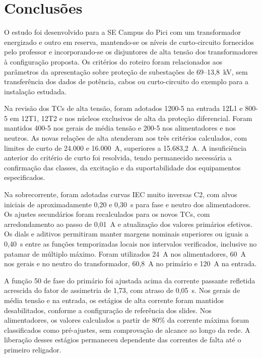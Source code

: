 \newpage
\section{\textbf{Conclusões}}

O estudo foi desenvolvido para a SE Campus do Pici com um transformador energizado e outro em reserva, mantendo-se os níveis de curto-circuito fornecidos pelo professor e incorporando-se os disjuntores de alta tensão dos transformadores à configuração proposta. Os critérios do roteiro foram relacionados aos parâmetros da apresentação sobre proteção de subestações de 69--13,8~kV, sem transferência dos dados de potência, cabos ou curto-circuito do exemplo para a instalação estudada.

Na revisão dos TCs de alta tensão, foram adotados 1200-5 na entrada 12L1 e 800-5 em 12T1, 12T2 e nos núcleos exclusivos de alta da proteção diferencial. Foram mantidos 400-5 nos gerais de média tensão e 200-5 nos alimentadores e nos neutros. As novas relações de alta atenderam aos três critérios calculados, com limites de curto de 24.000 e 16.000~A, superiores a 15.683,2~A. A insuficiência anterior do critério de curto foi resolvida, tendo permanecido necessária a confirmação das classes, da excitação e da suportabilidade dos equipamentos especificados.

Na sobrecorrente, foram adotadas curvas IEC muito inversas C2, com alvos iniciais de aproximadamente 0,20 e 0,30~s para fase e neutro dos alimentadores. Os ajustes secundários foram recalculados para os novos TCs, com arredondamento ao passo de 0,01~A e atualização dos valores primários efetivos. Os dials e aditivos permitiram manter margens nominais superiores ou iguais a 0,40~s entre as funções temporizadas locais nos intervalos verificados, inclusive no patamar de múltiplo máximo. Foram utilizados 24~A nos alimentadores, 60~A nos gerais e no neutro do transformador, 60,8~A no primário e 120~A na entrada.

A função 50 de fase do primário foi ajustada acima da corrente passante refletida acrescida do fator de assimetria de 1,73, com atraso de 0,05~s. Nos gerais de média tensão e na entrada, os estágios de alta corrente foram mantidos desabilitados, conforme a configuração de referência dos slides. Nos alimentadores, os valores calculados a partir de 80\% da corrente máxima foram classificados como pré-ajustes, sem comprovação de alcance ao longo da rede. A liberação desses estágios permaneceu dependente das correntes de falta até o primeiro religador.

